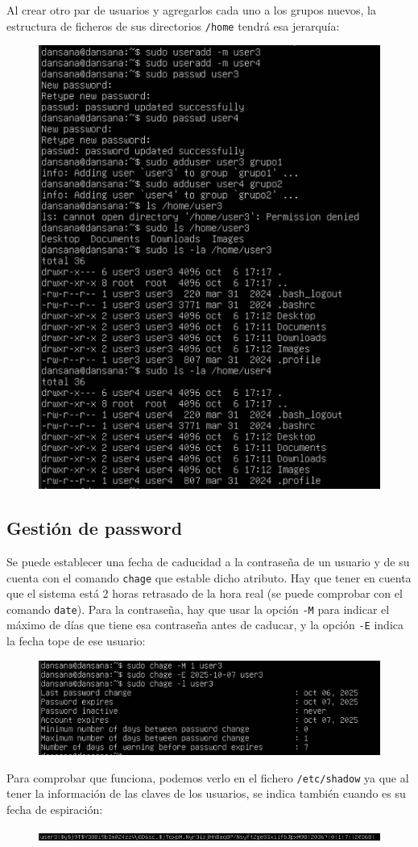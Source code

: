 \documentclass[10pt]{article}
\begin{document}
	Al crear otro par de usuarios y agregarlos cada uno a los grupos nuevos, la estructura de ficheros de sus directorios \verb|/home| tendrá esa jerarquía:
	\begin{figure}[H]
		\setlength{\abovecaptionskip}{0cm}
		\setlength{\belowcaptionskip}{0cm}
		\centering
		\includegraphics[width=0.6\linewidth]{Recursos/skel.png}
	\end{figure}
	\clearpage
	
	\subsection{Gestión de password}
	Se puede establecer una fecha de caducidad a la contraseña de un usuario y de su cuenta con el comando \verb|chage| que estable dicho atributo. Hay que tener en cuenta que el sistema está 2 horas retrasado de la hora real (se puede comprobar con el comando \verb|date|). Para la contraseña, hay que usar la opción \verb|-M| para indicar el máximo de días que tiene esa contraseña antes de caducar, y la opción \verb|-E| indica la fecha tope de ese usuario:
	\begin{figure}[H]
		\setlength{\abovecaptionskip}{0cm}
		\setlength{\belowcaptionskip}{0cm}
		\centering
		\includegraphics[width=0.7\linewidth]{Recursos/chage.png}
	\end{figure}
	Para comprobar que funciona, podemos verlo en el fichero \verb|/etc/shadow| ya que al tener la información de las claves de los usuarios, se indica también cuando es su fecha de espiración:
	\begin{figure}[H]
		\setlength{\abovecaptionskip}{0cm}
		\setlength{\belowcaptionskip}{0cm}
		\centering
		\includegraphics[width=\linewidth]{Recursos/shadowChage.png}
	\end{figure}
	
	\clearpage
	
	
	
\end{document}
